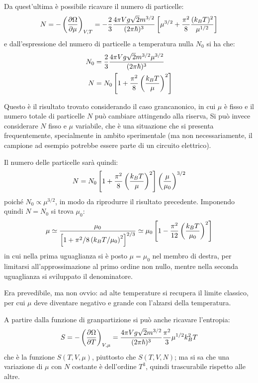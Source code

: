 Da quest'ultima è possibile ricavare il numero di particelle:
\begin{equation*}
N = - \left(\frac{\partial {\Omega}}{\partial {\mu}}\right)_{V,T} = - \frac{2}{3} \frac{4\pi V g \sqrt{2} m^{3/2}}{(2\pi \hbar)^3}\left[\mu^{3/2} + \frac{\pi^2}{8} \frac{(k_B T)^2}{\mu^{1/2}}\right]
\end{equation*}
e dall'espressione del numero di particelle a temperatura nulla $N_0$ si ha che:
\begin{align*}
N_0 &= \frac{2}{3} \frac{4\pi V g \sqrt{2} m^{3/2} \mu^{3/2}}{(2\pi \hbar)^3}\\
N &= N_0\left[1 + \frac{\pi^2}{8} \left(\frac{k_B T}{\mu}\right)^2\right]
\end{align*}

Questo è il risultato trovato considerando il caso grancanonico, in cui $\mu$ è fisso e il numero totale di particelle $N$ può cambiare attingendo alla riserva,
Si può invece considerare $N$ fisso e $\mu$ variabile, che è una situazione che si presenta frequentemente, specialmente in ambito sperimentale (ma non necessariamente, il campione ad esempio potrebbe essere parte di un circuito elettrico).

Il numero delle particelle sarà quindi:
\begin{equation*}
N = N_0\left[1 + \frac{\pi^2}{8} \left(\frac{k_B T}{\mu}\right)^2\right]\left(\frac{\mu}{\mu_0}\right)^{3/2}
\end{equation*}
poiché $N_0 \propto \mu^{3/2}$, in modo da riprodurre il risultato precedente. Imponendo quindi $N = N_0$ si trova $\mu_0$:
\begin{equation*}
\mu \simeq \frac{\mu_0}{\left[1 + {\pi^2}/{8} \left({k_B T}/{\mu_0}\right)^2\right]^{2/3}} \simeq \mu_0 \left[1 - \frac{\pi^2}{12} \left(\frac{k_B T}{\mu_0}\right)^2\right]
\end{equation*} 
in cui nella prima uguaglianza si è posto $\mu = \mu_0$ nel membro di destra, per limitarsi all'approssimazione al primo ordine non nullo, mentre nella seconda uguaglianza si sviluppato il denominatore.

Era prevedibile, ma non ovvio: ad alte temperature si recupera il limite classico, per cui $\mu$ deve diventare negativo e grande con l'alzarsi della temperatura.
\newline

A partire dalla funzione di granpartizione si può anche ricavare l'entropia:
\begin{equation*}
S = - \left(\frac{\partial {\Omega}}{\partial {T}}\right)_{V, \mu} = \frac{4\pi V g \sqrt{2} m^{3/2}}{(2\pi \hbar)^3} \frac{\pi^2}{3} \mu^{1/2} k_B^2 T 
\end{equation*}
che è la funzione $S(T,V,\mu)$, piuttosto che $S(T,V,N)$; ma si sa che una variazione di $ \mu $ con $  N $ costante è dell'ordine $ T^3 $, quindi trascurabile rispetto alle altre.

